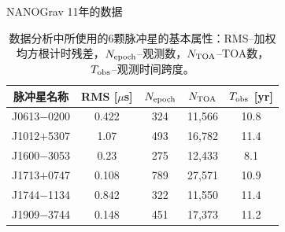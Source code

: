 \documentclass[xcolor={svgnames},compress]{beamer}
\let\olditem\item
\renewcommand{\item}{%
    \olditem\vspace{\fill}}
\def\e{\begin{equation}}
\def\q{\end{equation}}
\begin{document}
\begin{frame}{NANOGrav 11年的数据}
    \begin{table}[htb]
        \begin{center}
            \begin{tabular}{ccccc}
                \hline\hline
                脉冲星名称\hspace{1mm} & RMS [$\mu$s]\hspace{1mm} & $N_{\rm{epoch}}$\hspace{1mm} & $N_{\rm{TOA}}$\hspace{1mm} & $T_{\rm{obs}}$ [yr] \\
                \hline    
                J0613$-$0200 & 0.422 & 324 & 11,566 & 10.8  \\
                J1012$+$5307 & 1.07 & 493 & 16,782 & 11.4  \\
                J1600$-$3053 & 0.23 & 275 & 12,433 & 8.1  \\
                J1713$+$0747 & 0.108 & 789 & 27,571 & 10.9  \\
                J1744$-$1134 & 0.842 & 322 & 11,550 & 11.4  \\
                J1909$-$3744 & 0.148 & 451 & 17,373 & 11.2  \\    
                \hline \hline
            \end{tabular}
            \caption[数据分析中所使用的6颗脉冲星的基本属性：RMS--加权均方根计时残差，$N_{\rm{epoch}}$--观测数，$N_{\rm{TOA}}$--TOA数，$T_{\rm{obs}}$--观测时间跨度。]{数据分析中所使用的6颗脉冲星的基本属性：RMS--加权均方根计时残差，$N_{\rm{epoch}}$--观测数，$N_{\rm{TOA}}$--TOA数，$T_{\rm{obs}}$--观测时间跨度。}
                \end{center}
        \end{table}
\end{frame}


%    
\end{document}
